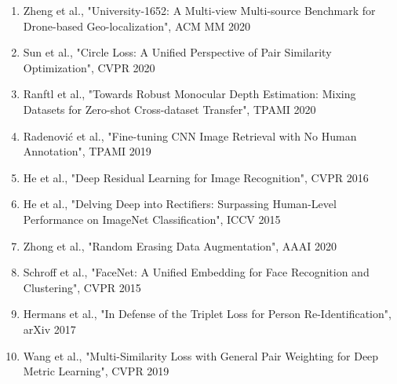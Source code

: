 \documentclass[12pt,a4paper]{article}
\begin{document}
\begin{enumerate}
    \item Zheng et al., "University-1652: A Multi-view Multi-source Benchmark for Drone-based Geo-localization", ACM MM 2020
    
    \item Sun et al., "Circle Loss: A Unified Perspective of Pair Similarity Optimization", CVPR 2020
    
    \item Ranftl et al., "Towards Robust Monocular Depth Estimation: Mixing Datasets for Zero-shot Cross-dataset Transfer", TPAMI 2020
    
    \item Radenović et al., "Fine-tuning CNN Image Retrieval with No Human Annotation", TPAMI 2019
    
    \item He et al., "Deep Residual Learning for Image Recognition", CVPR 2016
    
    \item He et al., "Delving Deep into Rectifiers: Surpassing Human-Level Performance on ImageNet Classification", ICCV 2015
    
    \item Zhong et al., "Random Erasing Data Augmentation", AAAI 2020
    
    \item Schroff et al., "FaceNet: A Unified Embedding for Face Recognition and Clustering", CVPR 2015
    
    \item Hermans et al., "In Defense of the Triplet Loss for Person Re-Identification", arXiv 2017
    
    \item Wang et al., "Multi-Similarity Loss with General Pair Weighting for Deep Metric Learning", CVPR 2019
\end{enumerate}
\end{document}
